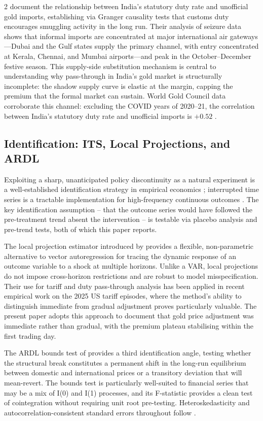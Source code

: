 \documentclass[12pt]{article}
\begin{document}
\begin{multicols}{2}
\citet{GoldSmuggling2024} document the relationship between India's statutory duty rate and unofficial gold imports, establishing via Granger causality tests that customs duty encourages smuggling activity in the long run. Their analysis of seizure data shows that informal imports are concentrated at major international air gateways---Dubai and the Gulf states supply the primary channel, with entry concentrated at Kerala, Chennai, and Mumbai airports---and peak in the October--December festive season. This supply-side substitution mechanism is central to understanding why pass-through in India's gold market is structurally incomplete: the shadow supply curve is elastic at the margin, capping the premium that the formal market can sustain. World Gold Council data corroborate this channel: excluding the COVID years of 2020--21, the correlation between India's statutory duty rate and unofficial imports is $+0.52$ \citep{WGC2026May}.

\subsection*{Identification: ITS, Local Projections, and ARDL}

Exploiting a sharp, unanticipated policy discontinuity as a natural experiment is a well-established identification strategy in empirical economics \citep{Nakamura2018}; interrupted time series is a tractable implementation for high-frequency continuous outcomes \citep{Bernal2017}. The key identification assumption -- that the outcome series would have followed the pre-treatment trend absent the intervention -- is testable via placebo analysis and pre-trend tests, both of which this paper reports.

The local projection estimator introduced by \citet{Jorda2005} provides a flexible, non-parametric alternative to vector autoregression for tracing the dynamic response of an outcome variable to a shock at multiple horizons. Unlike a VAR, local projections do not impose cross-horizon restrictions and are robust to model misspecification. Their use for tariff and duty pass-through analysis has been applied in recent empirical work on the 2025 US tariff episodes, where the method's ability to distinguish immediate from gradual adjustment proves particularly valuable. The present paper adopts this approach to document that gold price adjustment was immediate rather than gradual, with the premium plateau stabilising within the first trading day.

The ARDL bounds test of \citet{Pesaran2001} provides a third identification angle, testing whether the structural break constitutes a permanent shift in the long-run equilibrium between domestic and international prices or a transitory deviation that will mean-revert. The bounds test is particularly well-suited to financial series that may be a mix of I(0) and I(1) processes, and its F-statistic provides a clean test of cointegration without requiring unit root pre-testing. Heteroskedasticity and autocorrelation-consistent standard errors throughout follow \citet{Newey1987}.


\end{multicols}
\end{document}
